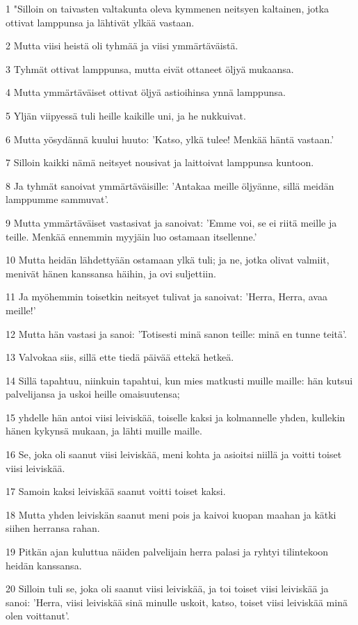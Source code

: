 \par 1 "Silloin on taivasten valtakunta oleva kymmenen neitsyen kaltainen, jotka ottivat lamppunsa ja lähtivät ylkää vastaan.
\par 2 Mutta viisi heistä oli tyhmää ja viisi ymmärtäväistä.
\par 3 Tyhmät ottivat lamppunsa, mutta eivät ottaneet öljyä mukaansa.
\par 4 Mutta ymmärtäväiset ottivat öljyä astioihinsa ynnä lamppunsa.
\par 5 Yljän viipyessä tuli heille kaikille uni, ja he nukkuivat.
\par 6 Mutta yösydännä kuului huuto: 'Katso, ylkä tulee! Menkää häntä vastaan.'
\par 7 Silloin kaikki nämä neitsyet nousivat ja laittoivat lamppunsa kuntoon.
\par 8 Ja tyhmät sanoivat ymmärtäväisille: 'Antakaa meille öljyänne, sillä meidän lamppumme sammuvat'.
\par 9 Mutta ymmärtäväiset vastasivat ja sanoivat: 'Emme voi, se ei riitä meille ja teille. Menkää ennemmin myyjäin luo ostamaan itsellenne.'
\par 10 Mutta heidän lähdettyään ostamaan ylkä tuli; ja ne, jotka olivat valmiit, menivät hänen kanssansa häihin, ja ovi suljettiin.
\par 11 Ja myöhemmin toisetkin neitsyet tulivat ja sanoivat: 'Herra, Herra, avaa meille!'
\par 12 Mutta hän vastasi ja sanoi: 'Totisesti minä sanon teille: minä en tunne teitä'.
\par 13 Valvokaa siis, sillä ette tiedä päivää ettekä hetkeä.
\par 14 Sillä tapahtuu, niinkuin tapahtui, kun mies matkusti muille maille: hän kutsui palvelijansa ja uskoi heille omaisuutensa;
\par 15 yhdelle hän antoi viisi leiviskää, toiselle kaksi ja kolmannelle yhden, kullekin hänen kykynsä mukaan, ja lähti muille maille.
\par 16 Se, joka oli saanut viisi leiviskää, meni kohta ja asioitsi niillä ja voitti toiset viisi leiviskää.
\par 17 Samoin kaksi leiviskää saanut voitti toiset kaksi.
\par 18 Mutta yhden leiviskän saanut meni pois ja kaivoi kuopan maahan ja kätki siihen herransa rahan.
\par 19 Pitkän ajan kuluttua näiden palvelijain herra palasi ja ryhtyi tilintekoon heidän kanssansa.
\par 20 Silloin tuli se, joka oli saanut viisi leiviskää, ja toi toiset viisi leiviskää ja sanoi: 'Herra, viisi leiviskää sinä minulle uskoit, katso, toiset viisi leiviskää minä olen voittanut'.
